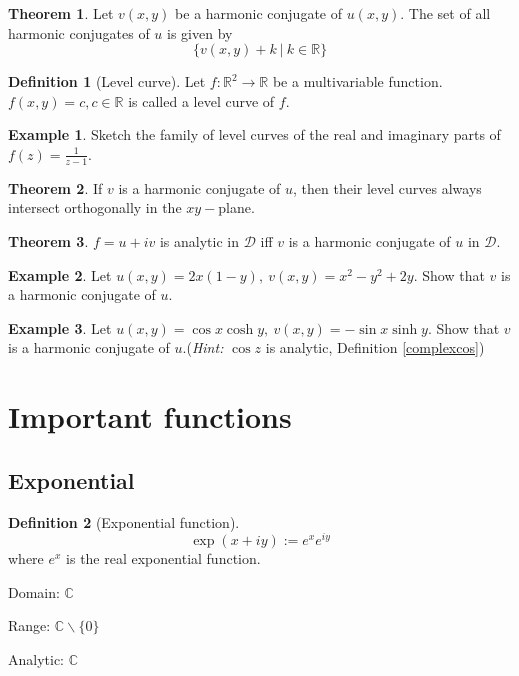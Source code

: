 \documentclass[10pt, a4paper]{extarticle}
\theoremstyle{definition}
\newtheorem{thm}{Theorem}
\newtheorem{defn}{Definition}
\newtheorem{eg}{Example}
\begin{document}
\begin{thm}
	Let $v(x,y)$ be a harmonic conjugate of $u(x,y)$. The set of all harmonic conjugates of $u$ is given by
	\[\{v(x,y)+k\ |\ k\in \mathbb{R}\}\]
\end{thm}

\begin{defn}[Level curve]
	Let $f:\mathbb{R}^2\to\mathbb{R}$ be a multivariable function. $f(x,y)=c, c\in\mathbb{R}$ is called a level curve of $f$.
\end{defn}
\begin{eg}
	Sketch the family of level curves of the real and imaginary parts of $f(z)=\frac{1}{z-1}$.
\end{eg}

\begin{thm}
	If $v$ is a harmonic conjugate of $u$, then their level curves always intersect orthogonally in the $xy-$plane.
\end{thm}

\begin{thm}
	$f=u+iv$ is analytic in $\mathscr{D}$ iff $v$ is a harmonic conjugate of $u$ in $\mathscr{D}$.
\end{thm}
\begin{eg}
	Let $u(x,y)=2x(1-y),\ v(x,y)=x^2-y^2+2y$. Show that $v$ is a harmonic conjugate of $u$.
\end{eg}
\begin{eg}
	Let $u(x,y)=\cos x\cosh y,\ v(x,y)=-\sin x\sinh y$. Show that $v$ is a harmonic conjugate of $u$.(\textit{Hint: }$\cos z$ is analytic, Definition \ref{complexcos})
\end{eg}

\section{Important functions}
\subsection{Exponential}
\begin{defn}[Exponential function]
	\[\exp(x+iy):=e^{x}e^{iy}\]
	where $e^x$ is the real exponential function.

	Domain: $\mathbb{C}$

	Range: $\mathbb{C}\backslash\{0\}$

	Analytic: $\mathbb{C}$
\end{defn}
\end{document}
